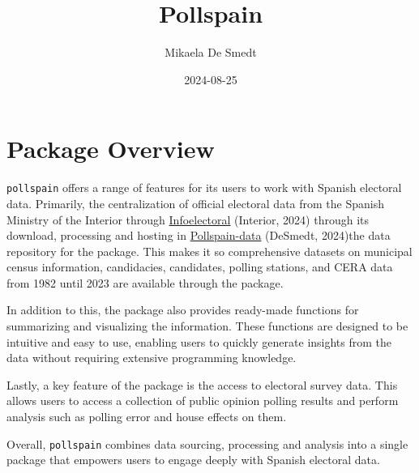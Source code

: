 \documentclass[
  letterpaper,
  DIV=11,
  numbers=noendperiod]{scrreprt}
\title{Pollspain}
\author{Mikaela De Smedt}
\date{2024-08-25}
\renewcommand*\contentsname{Table of contents}
\newcommand\contentsname{Table of contents}
\begin{document}
\maketitle
\ifdefined\Shaded\renewenvironment{Shaded}{\begin{tcolorbox}[interior hidden, sharp corners, borderline west={3pt}{0pt}{shadecolor}, breakable, frame hidden, boxrule=0pt, enhanced]}{\end{tcolorbox}}\fi

\renewcommand*\contentsname{Table of contents}
{
\hypersetup{linkcolor=}
\setcounter{tocdepth}{2}
\tableofcontents
}

\hypertarget{package-overview}{%
\chapter*{Package Overview}\label{package-overview}}


\texttt{pollspain} offers a range of features for its users to work with
Spanish electoral data. Primarily, the centralization of official
electoral data from the Spanish Ministry of the Interior through
\href{https://infoelectoral.interior.gob.es/es/elecciones-celebradas/area-de-descargas/}{Infoelectoral}
(Interior, 2024) through its download, processing and hosting in
\href{https://github.com/mikadsr/Pollspain-data}{Pollspain-data}
(DeSmedt, 2024)the data repository for the package. This makes it so
comprehensive datasets on municipal census information, candidacies,
candidates, polling stations, and CERA data from 1982 until 2023 are
available through the package.

In addition to this, the package also provides ready-made functions for
summarizing and visualizing the information. These functions are
designed to be intuitive and easy to use, enabling users to quickly
generate insights from the data without requiring extensive programming
knowledge.

Lastly, a key feature of the package is the access to electoral survey
data. This allows users to access a collection of public opinion polling
results and perform analysis such as polling error and house effects on
them.

Overall, \texttt{pollspain} combines data sourcing, processing and
analysis into a single package that empowers users to engage deeply with
Spanish electoral data.
\end{document}
